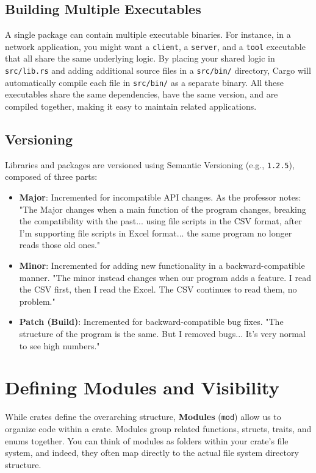 \subsection{Building Multiple Executables}
A single package can contain multiple executable binaries. For instance, in a network application, you might want a \texttt{client}, a \texttt{server}, and a \texttt{tool} executable that all share the same underlying logic. By placing your shared logic in \texttt{src/lib.rs} and adding additional source files in a \texttt{src/bin/} directory, Cargo will automatically compile each file in \texttt{src/bin/} as a separate binary. All these executables share the same dependencies, have the same version, and are compiled together, making it easy to maintain related applications.

\subsection{Versioning}
Libraries and packages are versioned using Semantic Versioning (e.g., \texttt{1.2.5}), composed of three parts:
\begin{itemize}
    \item \textbf{Major}: Incremented for incompatible API changes. As the professor notes: "The Major changes when a main function of the program changes, breaking the compatibility with the past... using file scripts in the CSV format, after I'm supporting file scripts in Excel format... the same program no longer reads those old ones."
    \item \textbf{Minor}: Incremented for adding new functionality in a backward-compatible manner. "The minor instead changes when our program adds a feature. I read the CSV first, then I read the Excel. The CSV continues to read them, no problem."
    \item \textbf{Patch (Build)}: Incremented for backward-compatible bug fixes. "The structure of the program is the same. But I removed bugs... It's very normal to see high numbers."
\end{itemize}

\section{Defining Modules and Visibility}

While crates define the overarching structure, \textbf{Modules} (\texttt{mod}) allow us to organize code within a crate. Modules group related functions, structs, traits, and enums together. You can think of modules as folders within your crate's file system, and indeed, they often map directly to the actual file system directory structure.

